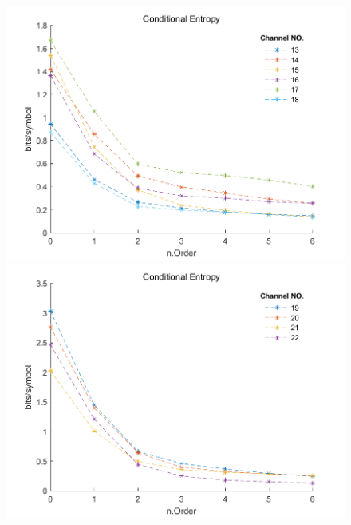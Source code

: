 \documentclass[notes=hide]{beamer}
\begin{document}
\begin{frame}
\begin{figure}
   	\includegraphics[scale=0.26]{Vortrag/10f6oc13to18.png}
   	\includegraphics[scale=0.26]{Vortrag/10f6oc19to22.png}
   \end{figure}
\end{frame}


\newpage
\end{document}
